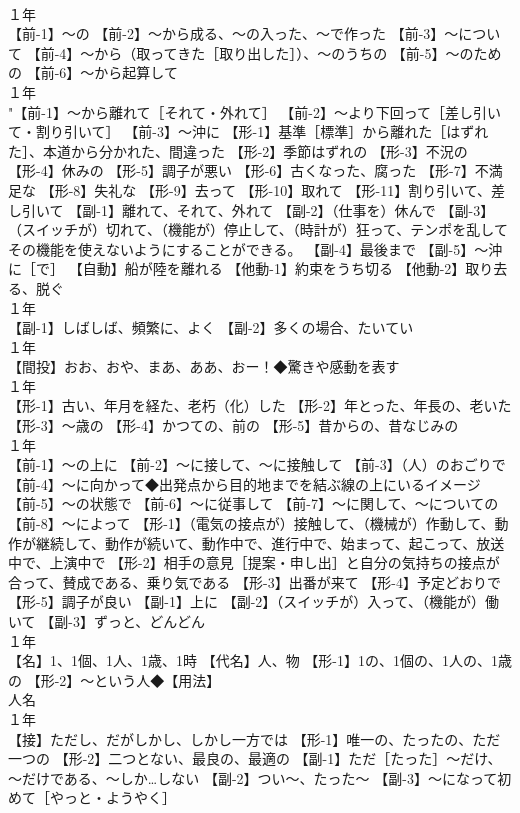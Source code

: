 \documentclass[8pt]{extreport}
\begin{document}
\begin{CJK}{UTF8}{min}
\\	１年	
\\	【前-1】～の 【前-2】～から成る、～の入った、～で作った 【前-3】～について 【前-4】～から（取ってきた［取り出した］）、～のうちの 【前-5】～のための 【前-6】～から起算して
\\	１年	
\\	"【前-1】～から離れて［それて・外れて］ 【前-2】～より下回って［差し引いて・割り引いて］ 【前-3】～沖に 【形-1】基準［標準］から離れた［はずれた］、本道から分かれた、間違った 【形-2】季節はずれの 【形-3】不況の 【形-4】休みの 【形-5】調子が悪い 【形-6】古くなった、腐った 【形-7】不満足な 【形-8】失礼な 【形-9】去って 【形-10】取れて 【形-11】割り引いて、差し引いて 【副-1】離れて、それて、外れて 【副-2】（仕事を）休んで 【副-3】（スイッチが）切れて、（機能が）停止して、（時計が）狂って、テンポを乱して 
\\	その機能を使えないようにすることができる。 【副-4】最後まで 【副-5】～沖に［で］ 【自動】船が陸を離れる 【他動-1】約束をうち切る 【他動-2】取り去る、脱ぐ
\\	１年	
\\	【副-1】しばしば、頻繁に、よく 【副-2】多くの場合、たいてい
\\	１年	
\\	【間投】おお、おや、まあ、ああ、おー！◆驚きや感動を表す
\\	１年	
\\	【形-1】古い、年月を経た、老朽（化）した 【形-2】年とった、年長の、老いた 【形-3】～歳の 【形-4】かつての、前の 【形-5】昔からの、昔なじみの
\\	１年	
\\	【前-1】～の上に 【前-2】～に接して、～に接触して 【前-3】（人）のおごりで 【前-4】～に向かって◆出発点から目的地までを結ぶ線の上にいるイメージ 【前-5】～の状態で 【前-6】～に従事して 【前-7】～に関して、～についての 【前-8】～によって 【形-1】（電気の接点が）接触して、（機械が）作動して、動作が継続して、動作が続いて、動作中で、進行中で、始まって、起こって、放送中で、上演中で 【形-2】相手の意見［提案・申し出］と自分の気持ちの接点が合って、賛成である、乗り気である 【形-3】出番が来て 【形-4】予定どおりで 【形-5】調子が良い 【副-1】上に 【副-2】（スイッチが）入って、（機能が）働いて 【副-3】ずっと、どんどん
\\	１年	
\\	【名】1、1個、1人、1歳、1時 【代名】人、物 【形-1】1の、1個の、1人の、1歳の 【形-2】～という人◆【用法】
\\	人名
\\	１年	
\\	【接】ただし、だがしかし、しかし一方では 【形-1】唯一の、たったの、ただ一つの 【形-2】二つとない、最良の、最適の 【副-1】ただ［たった］～だけ、～だけである、～しか…しない 【副-2】つい～、たった～ 【副-3】～になって初めて［やっと・ようやく］

\end{CJK}
\end{document}
